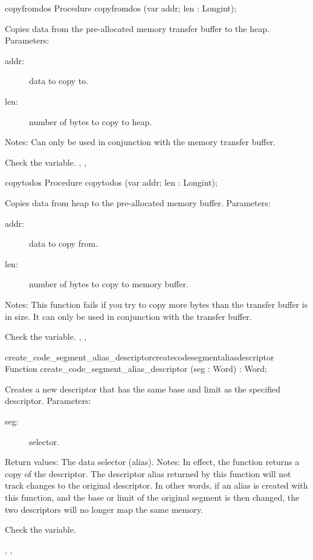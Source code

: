 \begin{procedure}{copyfromdos}
\Declaration
Procedure copyfromdos (var addr; len : Longint);

\Description

Copies data from the pre-allocated \dos memory transfer buffer to the heap.
Parameters:
\begin{description}
\item[addr:\ ] data to copy to.
\item[len:\ ] number of bytes to copy to heap.
\end{description}
Notes:
Can only be used in conjunction with the \dos memory transfer buffer.

\Errors
Check the  variable.
\SeeAlso
{}, , 
\end{procedure}
\begin{procedure}{copytodos}
\Declaration
Procedure copytodos (var addr; len : Longint);

\Description
Copies data from heap to the pre-allocated \dos memory buffer.
Parameters:
\begin{description}
\item[addr:\ ] data to copy from.
\item[len:\ ] number of bytes to copy to \dos memory buffer.
\end{description}
Notes: This function fails if you try to copy more bytes than the transfer
buffer is in size. It can only be used in conjunction with the transfer
buffer.

\Errors
 Check the  variable.
\SeeAlso
{}, , 
\end{procedure}
\begin{functionl}{create\_code\_segment\_alias\_descriptor}{createcodesegmentaliasdescriptor}
\Declaration
Function create\_code\_segment\_alias\_descriptor (seg : Word) : Word;

\Description

Creates a new descriptor that has the same base and limit as the specified
descriptor.
Parameters: 
\begin{description}
\item[seg:\ ] selector.
\end{description}
Return values: The data selector (alias).
Notes: In effect, the function returns a copy of the descriptor. The
descriptor alias returned by this function will not track changes to the
original descriptor. In other words, if an alias is created with this
function, and the base or limit of the original segment is then changed, the
two descriptors will no longer map the same memory.

\Errors
Check the  variable.
\SeeAlso
 
,
, 
\end{functionl}
